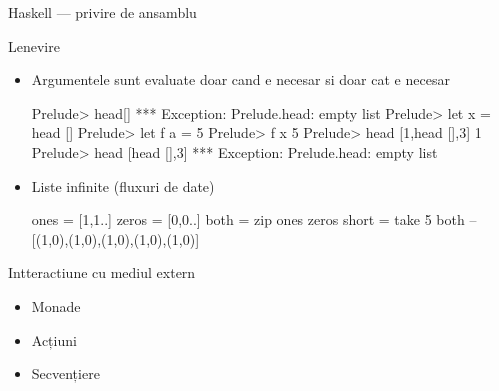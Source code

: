 \documentclass[handout,xcolor=pdftex,romanian,colorlinks]{beamer}
\begin{document}
\begin{section}{Haskell --- privire de ansamblu}
\begin{frame}[fragile]{Lenevire}
\begin{itemize}
\item Argumentele sunt evaluate doar cand e necesar si doar cat e necesar
\begin{asciihs}
Prelude> head[]
*** Exception: Prelude.head: empty list
Prelude> let x = head []
Prelude> let f a = 5
Prelude> f x
5
Prelude> head [1,head [],3]
1
Prelude> head [head [],3]
*** Exception: Prelude.head: empty list
\end{asciihs}
\item Liste infinite (fluxuri de date)
\begin{asciihs}
ones = [1,1..]
zeros = [0,0..]
both = zip ones zeros
short = take 5 both   -- [(1,0),(1,0),(1,0),(1,0),(1,0)]
\end{asciihs}
\end{itemize}
\end{frame}

\begin{frame}{Intteractiune cu mediul extern}
\begin{itemize}
\item Monade
\item Acțiuni
\item Secvențiere
\end{itemize}
\end{frame}

\end{section}
\end{document}
